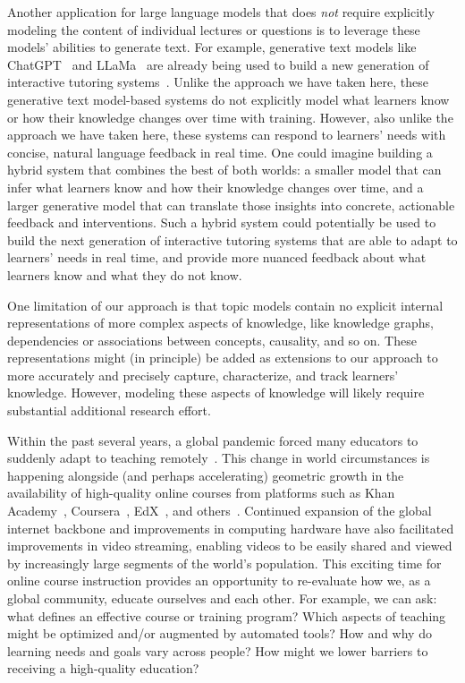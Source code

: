 \documentclass[10pt]{article}
\begin{document}
Another application for large language models that does \textit{not} require
explicitly modeling the content of individual lectures or questions is to
leverage these models' abilities to generate text. For example, generative text
models like ChatGPT~\citep{ChatGPT} and LLaMa~\citep{TouvEtal23} are already
being used to build a new generation of interactive tutoring
systems~\citep[e.g.,][]{MannEtal23b}. Unlike the approach we have taken here,
these generative text model-based systems do not explicitly model what learners
know or how their knowledge changes over time with training. However, also 
unlike the approach we have taken here, these systems can respond to learners'
needs with concise, natural language feedback in real time. One could imagine 
building a hybrid system that combines the best of both worlds: a smaller model 
that can infer what learners know and how their knowledge changes over time, and 
a larger generative model that can translate those insights into concrete, 
actionable feedback and interventions. Such a hybrid system could potentially be
used to build the next generation of interactive tutoring systems that are able to adapt to learners'
needs in real time, and provide more nuanced feedback about what learners know
and what they do not know. 

One limitation of our approach is that topic models contain no explicit
internal representations of more complex aspects of knowledge, like
knowledge graphs, dependencies or associations between concepts, causality, and
so on. These representations might (in principle) be added as extensions to our
approach to more accurately and precisely capture, characterize, and track
learners' knowledge. However, modeling these aspects of knowledge will likely
require substantial additional research effort.

Within the past several years, a global pandemic forced many educators to
suddenly adapt to teaching remotely~\citep{MoseEtal21, ShimLee20, KawaEtal21,
Whal20}. This change in world circumstances is happening alongside (and perhaps
accelerating) geometric growth in the availability of high-quality online
courses from platforms such as Khan Academy~\citep{Khan04},
Coursera~\citep{Youn12}, EdX~\citep{Kolo13}, and others~\citep{RhoaEtal13}.
Continued expansion of the global internet backbone and improvements in
computing hardware have also facilitated improvements in video streaming,
enabling videos to be easily shared and viewed by increasingly large segments
of the world's population. This exciting time for online course instruction
provides an opportunity to re-evaluate how we, as a global community, educate
ourselves and each other. For example, we can ask: what defines an effective
course or training program? Which aspects of teaching might be optimized and/or
augmented by automated tools? How and why do learning needs and goals vary
across people? How might we lower barriers to receiving a high-quality
education?
\end{document}
